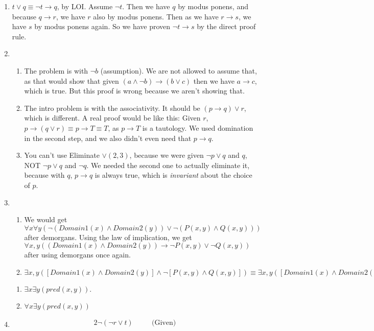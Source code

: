 \documentclass[12pt]{article}
\theoremstyle{definition}
\theoremstyle{remark}
\newcommand{\ra}{\rightarrow}
\newcommand{\justif}[1]{&\quad &\text{(#1)}}
\begin{document}
\begin{enumerate}[leftmargin=\labelsep]
		\item $t \lor q \equiv \lnot t \ra q$, by LOI. Assume $\lnot t$. Then we have $q$ by modus ponens, and because $q \ra r$, we have $r$ also by modus ponens. Then as we have $r \ra s$, we have $s$ by modus ponens again. So we have proven $\lnot t \ra s$ by the direct proof rule.
		\item
			\begin{enumerate}
				\item The problem is with $\lnot b$ (assumption). We are not allowed to assume that, as that would show that given $(a \land \lnot b) \ra (b \lor c)$ then we have $a \ra c$, which is true. But this proof is wrong because we aren't showing that.
				\item The intro problem is with the associativity. It should be $(p \ra q) \lor r$, which is different. A real proof would be like this: Given $r$, $p \ra (q \lor r) \equiv p \ra T \equiv T$, as $p \ra T$ is a tautology. We used domination in the second step, and we also didn't even need that $p \ra q$.
				\item You can't use Eliminate $\lor (2, 3)$, because we were given $\lnot p \lor q$ and $q$, NOT $\lnot p \lor q$ and $\lnot q$. We needed the second one to actually eliminate it, because with $q$, $p \ra q$ is always true, which is \textit{invariant} about the choice of $p$.
			\end{enumerate}
		\item 
			\begin{enumerate}
				\item
				We would get $\forall x \forall y (\lnot (Domain1(x) \land Domain2(y)) \lor \lnot (P(x, y) \land Q(x, y)))$ after demorgans. Using the law of implication, we get $\forall x,y ((Domain1(x) \land Domain2(y)) \ra \lnot P(x, y) \lor \lnot Q(x, y))$ after using demorgans once again.
				\item 
				$\exists x,y ([Domain1(x) \land Domain2(y)] \land  \lnot[P(x, y) \land Q(x, y)]) \equiv \exists x,y ([Domain1(x) \land Domain2(y)] \land [\lnot P(x, y)\lor \lnot Q(x, y)])$
			\end{enumerate}
				\begin{enumerate}
					\item $\exists x \exists y (pred(x, y))$.
					\item $\forall x \exists y (pred(x, y))$
				\end{enumerate}
		\item 
			\begin{alignat*}{2}
				\lnot (\lnot r \lor t) \justif{Given} \\

\end{alignat*}
\end{enumerate}
\end{document}
